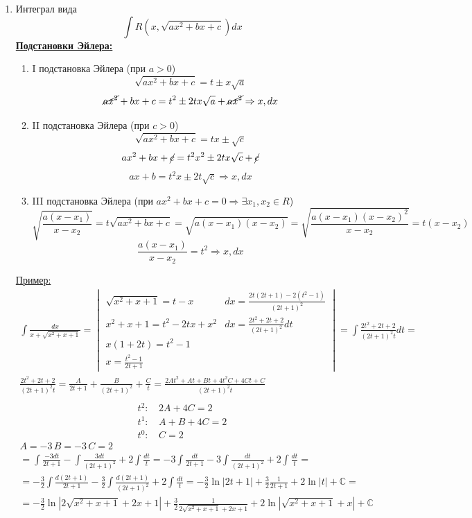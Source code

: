 \documentclass[12pt]{article}
\begin{document}
\begin{enumerate}
        \item Интеграл вида
        \[ \int R (x, \sqrt{ax^2 + bx + c})dx \]
        \underline{\textbf{Подстановки Эйлера:}}
        \begin{enumerate}
            \item I подстановка Эйлера (при $a > 0$)
            \[ \sqrt{ax^2 + bx + c} = t \pm x\sqrt{a} \]
            \[ \cancel{ax^2} + bx + c = t^2 \pm 2tx\sqrt{a} + \cancel{ax^2} \Rightarrow x, dx \]
            \item II подстановка Эйлера (при $c > 0$)
            \[ \sqrt{ax^2 + bx + c} = tx \pm \sqrt{c} \]
            \[ ax^2 + bx + \cancel{c} = t^2x^2 \pm 2tx\sqrt{c} + \cancel{c} \]
            \[ ax+b = t^2x \pm 2t\sqrt{c} \Rightarrow x, dx \]
            \item III подстановка Эйлера (при $ax^2 + bx + c = 0 \Rightarrow \exists x_1, x_2 \in R$)
            \[ \sqrt{\frac{a(x-x_1)}{x-x_2}} = t \sqrt{ax^2 + bx + c} = \sqrt{a(x-x_1)(x-x_2)} = \sqrt{\frac{a(x-x_1)(x-x_2)^2}{x-x_2}} = t(x-x_2) \]
            \[ \frac{a(x-x_1)}{x-x_2} = t^2 \Rightarrow x, dx \]
        \end{enumerate}
        \underline{Пример:}
        \begin{gather*}
            \int \frac{dx}{x + \sqrt{x^2+x+1}} = \begin{vmatrix}
                \sqrt{x^2 + x + 1} = t - x & dx = \frac{2t(2t+1)-2(t^2-1)}{(2t+1)^2} \\
                x^2 + x + 1 = t^2 - 2tx + x^2 & dx = \frac{2t^2 + 2t + 2}{(2t+1)^2}dt\\
                x(1 + 2t) = t^2 - 1\\
                x = \frac{t^2 - 1}{2t + 1}
            \end{vmatrix} = \int \frac{2t^2 + 2t + 2}{(2t+1)^2t}dt \boxed{=}\\
            \frac{2t^2 + 2t + 2}{(2t+1)^2t} = \frac{A}{2t+1} + \frac{B}{(2t+1)^2} + \frac{C}{t} = \frac{2At^2 + At + Bt + 4t^2C + 4Ct + C}{(2t+1)^2t}\\
        \end{gather*}
        \begin{align*}
            t^2 :\, &2A + 4C = 2\\
            t^1 :\, &A + B + 4C = 2\\
            t^0 :\, &C = 2
        \end{align*}
        \begin{gather*}
            A = -3\, B = -3\, C = 2\\
            \boxed{=} \int \frac{-3dt}{2t+1} - \int \frac{3dt}{(2t+1)^2}+2 \int \frac{dt}{t} = -3 \int \frac{dt}{2t+1} - 3 \int \frac{dt}{(2t+1)^2} + 2 \int \frac{dt}{t} =\\
            = -\frac{3}{2}\int \frac{d(2t+1)}{2t+1} - \frac{3}{2}\int \frac{d(2t+1)}{(2t+1)^2} + 2\int\frac{dt}{t} = -\frac{3}{2}\ln |2t+1| + \frac{3}{2}\frac{1}{2t+1} + 2 \ln |t| + \mathbb{C} =\\
            = -\frac{3}{2} \ln |2\sqrt{x^2+x+1}+2x+1| + \frac{3}{2}\frac{1}{2\sqrt{x^2+x+1}+2x+1} + 2 \ln |\sqrt{x^2+x+1}+x| + \mathbb{C}
        \end{gather*}


\end{enumerate}
\end{document}
